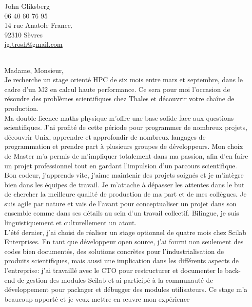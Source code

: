 \documentclass[12pt,a4paper]{letter}
\begin{document}
\begin{minipage}{.65\textwidth}
\begin{flushleft}
John {\sc Gliksberg}\\
06 40 60 76 95\\
14 rue Anatole France,\\
92310 Sèvres\\
\href{mailto:jg.trosh@gmail.com}
{jg.trosh@gmail.com}
\end{flushleft}
\end{minipage}\\[.3in]

Madame, Monsieur,
\\[.3in]
Je recherche un stage orienté HPC de six mois entre mars et septembre,
dans le cadre d'un M2 en calcul haute performance.
Ce sera pour moi l'occasion de résoudre des problèmes scientifiques
chez Thales et découvrir votre chaîne de production.
\\[.2in]
Ma double licence maths physique m'offre
une base solide face aux questions scientifiques.
J'ai profité de cette période pour programmer de nombreux projets,
découvrir Unix, apprendre et approfondir de nombreux langages de programmation
et prendre part à plusieurs groupes de développeurs.
Mon choix de Master m'a permis de m'impliquer totalement dans ma passion,
afin d'en faire un projet professionnel tout en gardant
l'impulsion d'un parcours scientifique.
\\[.2in]
Bon codeur, j'apprends vite, j'aime maintenir des projets
soignés et je m'intègre bien dans les équipes de travail.
Je m'attache à dépasser les attentes dans le but de chercher
la meilleure qualité de production de ma part et de mes collègues.
Je suis agile par nature et vais de l'avant pour conceptualiser un projet
dans son ensemble comme dans ses détails au sein d'un travail collectif.
Bilingue, je suis linguistiquement et culturellement un atout.
\\[.2in]
L'été dernier, j'ai choisi de réaliser un stage optionnel de quatre mois
chez Scilab Enterprises.
En tant que développeur open source, j'ai fourni non seulement
des codes bien documentés, des solutions concrètes pour l'industrialisation
de produits scientifiques, mais aussi une implication dans les différents
aspects de l'entreprise: j'ai travaillé avec le CTO pour restructurer
et documenter le back-end de gestion des modules Scilab
et ai participé à la communauté de développement pour packager et
débugger des modules utilisateurs.
Ce stage m'a beaucoup apporté et je veux mettre en œuvre mon expérience
\end{document}
